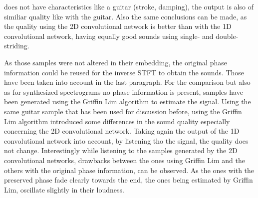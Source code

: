 does not have characteristics like a guitar (stroke, damping), the output is also of similiar quality like with the guitar. Also the same conclusions can be made, as the quality using the 2D convolutional network is better than with the 1D convolutional network, having equally good sounds using single- and double-striding. 

As those samples were not altered in their embedding, the original phase information could be reused for the inverse STFT to obtain the sounds. Those have been taken into account in the last paragraph. For the comparison but also as for synthesized spectrograms no phase information is present, samples have been generated using the Griffin Lim algorithm \cite{Griffin1984} to estimate the signal. Using the same guitar sample that has been used for discussion before, using the Griffin Lim algorithm introduced some differences in the sound quality especially concerning the 2D convolutional network. Taking again the output of the 1D convolutional network into account, by listening tho the signal, the quality does not change. Interestingly while listening to the samples generated by the 2D convolutional networks, drawbacks between the ones using Griffin Lim and the others with the original phase information, can be observed. As the ones with the preserved phase fade clearly towards the end, the ones being estimated by Griffin Lim, oscillate slightly in their loudness.

